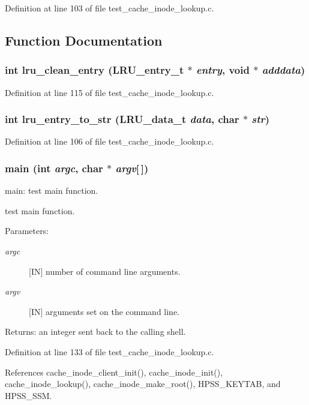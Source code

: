 Definition at line 103 of file test\_\-cache\_\-inode\_\-lookup.c.

\subsection{Function Documentation}
\subsubsection{\setlength{\rightskip}{0pt plus 5cm}int lru\_\-clean\_\-entry (LRU\_\-entry\_\-t $\ast$ {\em entry}, void $\ast$ {\em adddata})}\label{test__cache__inode__lookup_8c_a3}




Definition at line 115 of file test\_\-cache\_\-inode\_\-lookup.c.
\subsubsection{\setlength{\rightskip}{0pt plus 5cm}int lru\_\-entry\_\-to\_\-str (LRU\_\-data\_\-t {\em data}, char $\ast$ {\em str})}\label{test__cache__inode__lookup_8c_a2}




Definition at line 106 of file test\_\-cache\_\-inode\_\-lookup.c.
\subsubsection{\setlength{\rightskip}{0pt plus 5cm}main (int {\em argc}, char $\ast$ {\em argv}[$\,$])}\label{test__cache__inode__lookup_8c_a4}


main: test main function.

test main function.

\begin{Desc}
\item[Parameters:]
\begin{description}
\item[{\em argc}][IN] number of command line arguments. \item[{\em argv}][IN] arguments set on the command line.\end{description}
\end{Desc}
\begin{Desc}
\item[Returns:]an integer sent back to the calling shell. \end{Desc}


Definition at line 133 of file test\_\-cache\_\-inode\_\-lookup.c.

References cache\_\-inode\_\-client\_\-init(), cache\_\-inode\_\-init(), cache\_\-inode\_\-lookup(), cache\_\-inode\_\-make\_\-root(), HPSS\_\-KEYTAB, and HPSS\_\-SSM.